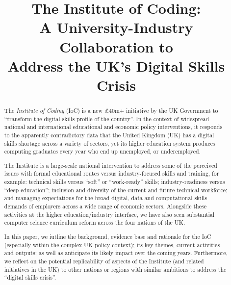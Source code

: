 \documentclass[conference]{IEEEtran}
\begin{document}
\title{The Institute of Coding:\\A University-Industry Collaboration
  to\\Address the UK's Digital Skills Crisis}

\author{
} %
 
\maketitle

\begin{abstract}
The {\emph{Institute of Coding}} (IoC) is a new \pounds40m+ initiative
by the UK Government to ``transform the digital skills profile of the
country''. In the context of widespread national and international
educational and economic policy interventions, it responds to the
apparently contradictory data that the United Kingdom (UK) has a
digital skills shortage across a variety of sectors, yet its higher
education system produces computing graduates every year who end up
unemployed, or underemployed.

The Institute is a large-scale national intervention to address some
of the perceived issues with formal educational routes versus
industry-focused skills and training, for example: technical skills
versus ``soft'' or ``work-ready'' skills; industry-readiness versus
``deep education''; inclusion and diversity of the current and future
technical workforce; and managing expectations for the broad digital,
data and computational skills demands of employers across a wide range
of economic sectors. Alongside these activities at the higher
education/industry interface, we have also seen substantial computer
science curriculum reform across the four nations of the UK.


In this paper, we iutline the background, evidence base and rationale
for the IoC (especially within the complex UK policy
context); its key themes, current activities and outputs; as well as
anticipate its likely impact over the coming years. Furthermore, we
reflect on the potential replicability of aspects of the Institute
(and related initiatives in the UK) to other nations or regions with
similar ambitions to address the ``digital skills crisis''.
\end{abstract}
\end{document}
